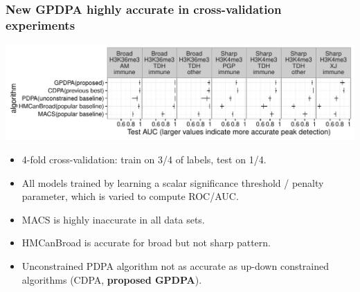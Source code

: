 \documentclass{beamer}
\begin{document}



 
\begin{frame}
  \frametitle{New GPDPA highly accurate in cross-validation experiments}
  \includegraphics[width=\textwidth]{figure-test-error-dots}
  \begin{itemize}
  \item 4-fold cross-validation: train on 3/4 of labels, test on 1/4.
  \item All models trained by learning a scalar significance
    threshold / penalty parameter, which is varied to compute ROC/AUC.
  \item MACS is highly inaccurate in all data sets.
  \item HMCanBroad is accurate for broad but not sharp pattern.
  \item Unconstrained PDPA algorithm not as accurate as up-down
    constrained algorithms (CDPA, \textbf{proposed GPDPA}).
  \end{itemize}
  \scriptsize
\end{frame}
\end{document}
